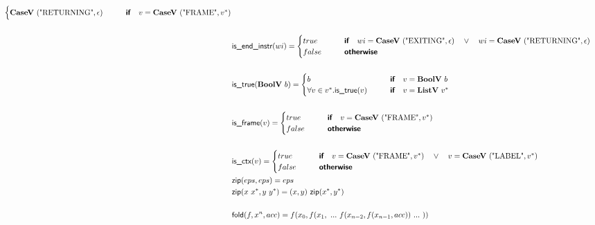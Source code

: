 \begin{align*}
\begin{cases}
    \casev ~ (\text{"RETURNING"}, \epsilon) &\quad\quad\premise{if}\quad v = \casev ~ (\text{"FRAME"}, \seq v)
  \end{cases} \\
%
\newline \\
  &\isendinstr(wi) =
  \begin{cases}
    true &\quad\quad\premise{if}\quad wi = \casev ~ (\text{"EXITING"}, \epsilon) \quad\lor\quad wi = \casev ~ (\text{"RETURNING"}, \epsilon)\\
    false &\quad\quad\premise{otherwise}
  \end{cases} \\
%
\newline \\
  &\istrue(\boolv ~ b) =
  \begin{cases}
  b &\quad\quad\premise{if}\quad v = \boolv ~ b \\
  \forall v \in \seq v. \istrue (v) &\quad\quad\premise{if}\quad v = \listv ~ \seq v \\
  \end{cases} \\
%
\newline \\
  &\isframe(v) =
  \begin{cases}
    true
    &\quad\quad\premise{if}\quad v = \casev ~ (\text{"FRAME"}, \seq v) \\
    false &\quad\quad\premise{otherwise}\\
  \end{cases}
  \\
%
\newline \\
  &\isctx(v) =
  \begin{cases}
    true
    &\quad\quad\premise{if}\quad v = \casev ~ (\text{"FRAME"}, \seq v) \quad\lor\quad v = \casev ~ (\text{"LABEL"}, \seq v) \\
    false &\quad\quad\premise{otherwise}\\
  \end{cases}
%
\newline \\
  &\zip(eps, eps) = eps \\
  &\zip(x ~ \seq{x}, y ~ \seq{y}) = (x, y) ~ \zip (\seq{x}, \seq{y}) \\
%
\newline \\
  &\fold(f, x^n, acc) = f(x_0, f(x_1, ~ ... ~ f(x_{n-2}, f(x_{n-1}, acc)) ~ ... ~ ))
\end{align*}





